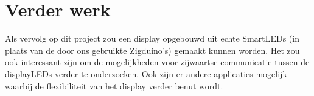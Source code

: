 \documentclass{article}
\begin{document}
\section{Verder werk}
Als vervolg op dit project zou een display opgebouwd uit echte SmartLEDs (in plaats van de door ons gebruikte Zigduino's) gemaakt kunnen worden. Het zou ook interessant zijn om de mogelijkheden voor zijwaartse communicatie tussen de displayLEDs verder te onderzoeken. Ook zijn er andere applicaties mogelijk waarbij de flexibiliteit van het display verder benut wordt.



\end{document}
